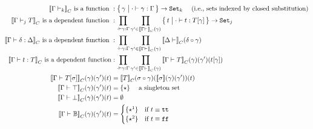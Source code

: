 \begin{align*}
  \denotesC{\goodCtx{\Gm}{k}} \text{ is a function }&: \setc{\gm}{\goodSub{\cdot}{\gm}{\Gm}} \to \Set{k} \quad \text{ (i.e., sets indexed by closed substitution)}\\
  \denotesC{\goodType{\Gm}{T}{j}} \text{ is a dependent function }&: \prod_{\goodSub{\cdot}{\gm}{\Gm}}\prod_{\gm' \in \denotesC{\goodCtx{\Gm}{}}(\gm)}\setc{t}{\goodTerm{\cdot}{t}{\sub{T}{\gm}}}\to\Set{j} \\
  \denotesC{\goodSub{\Gm}{\delta}{\Delta}} \text{ is a dependent function }&: \prod_{\goodSub{\cdot}{\gm}{\Gm}} \prod_{\gm' \in \denotesC{\goodCtx{\Gm}{}}(\gm)} \denotesC{\goodCtx{\Dl}{}}(\delta \circ \gm) \\
  \denotesC{\goodTerm{\Gm}{t}{T}} \text{ is a dependent function}&: \prod_{\goodSub{\cdot}{\gm}{\Gm}} \prod_{\gm' \in \denotesC{\goodCtx{\Gm}{}}(\gm)}\denotesC{\goodType{\Gm}{T}{}}(\gm)(\gm')(\sub{t}{\gm})\\
  \denotesC{\goodType{\Gm}{\sub{T}{\sigma}}{}}(\gm)(\gm')(t) &= \denotesC{T}(\sigma \circ \gm)(\denotes{\sigma}(\gm)(\gm'))(t)\\
  \denotesC{\goodType{\Gm}{\top}{}}(\gm)(\gm')(t) &= \{\star \} \quad \text{  a singleton set } \\
  \denotesC{\goodType{\Gm}{\bot}{}}(\gm)(\gm')(t) &= \emptyset \\
  \denotesC{\goodType{\Gm}{\cB}{}}(\gm)(\gm')(t) &= 
    \begin{cases}
      \{\star^1\} & \text{if } t \equiv \true \\
      \{\star^2\} & \text{if } t \equiv \false \\

\end{cases}
\end{align*}
